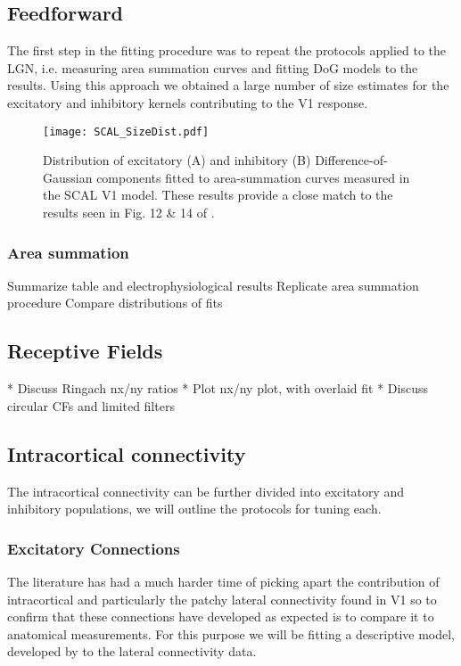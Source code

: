 \subsection{Feedforward}

The first step in the fitting procedure was to repeat the protocols
applied to the LGN, i.e. measuring area summation curves and fitting
DoG models to the results. Using this approach we obtained a large
number of size estimates for the excitatory and inhibitory kernels
contributing to the V1 response.

\begin{figure}
	\centering
        \texttt{[image: SCAL\_SizeDist.pdf]}
	\caption{Distribution of excitatory (A) and inhibitory (B)
          Difference-of-Gaussian components fitted to area-summation
          curves measured in the SCAL V1 model. These results provide
          a close match to the results seen in Fig. 12 \& 14 of
          \cite{Sceniak2001}.}
	\label{SCALSizeDist}
\end{figure}

\subsubsection{Area summation}

Summarize table and electrophysiological results
Replicate area summation procedure
Compare distributions of fits

\subsection{Receptive Fields}

* Discuss Ringach nx/ny ratios
* Plot nx/ny plot, with overlaid fit
* Discuss circular CFs and limited filters



\subsection{Intracortical connectivity}

The intracortical connectivity can be further divided into excitatory
and inhibitory populations, we will outline the protocols for tuning
each.

\subsubsection{Excitatory Connections}

The literature has had a much harder time of picking apart the
contribution of intracortical and particularly the patchy lateral
connectivity found in V1 so to confirm that these connections have
developed as expected is to compare it to anatomical measurements.
For this purpose we will be fitting a descriptive model, developed by
\cite{Buzas2006} to the lateral connectivity data.

